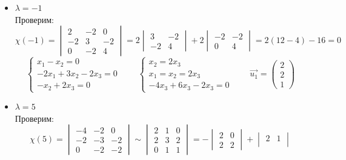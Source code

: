 \begin{itemize}
	\item $ \lambda = -1 $ \\
    Проверим:
    $$ \chi(-1) =
    \begin{vmatrix}
    	2 & -2 & 0 \\
        -2 & 3 & -2 \\
        0 & -2 & 4
    \end{vmatrix} = 2
    \begin{vmatrix}
    	3 & -2 \\
        -2 & 4
    \end{vmatrix} + 2
    \begin{vmatrix}
    	-2 & -2 \\
        0 & 4
    \end{vmatrix} = 2(12 - 4) - 16 = 0 $$
    $$
    \begin{cases}
    	x_1 - x_2 = 0 \\
        -2x_1 + 3x_2 - 2x_3 = 0 \\
        -x_2 + 2x_3 = 0
    \end{cases} \qquad
    \begin{cases}
    	x_2 = 2x_3 \\
        x_1 = x_2 = 2x_3 \\
        -4x_3 + 6x_3 - 2x_3 = 0
    \end{cases} \qquad \vec{u_1} =
    \begin{pmatrix}
    	2 \\
        2 \\
        1
    \end{pmatrix} $$
    \item $ \lambda = 5 $ \\
    Проверим:
    $$ \chi(5) =
    \begin{vmatrix}
    	-4 & -2 & 0 \\
        -2 & -3 & -2 \\
        0 & -2 & -2
    \end{vmatrix} \sim
    \begin{vmatrix}
    	2 & 1 & 0 \\
        2 & 3 & 2 \\
        0 & 1 & 1
    \end{vmatrix} = -
    \begin{vmatrix}
    	2 & 0 \\
        2 & 2
    \end{vmatrix} +
    \begin{vmatrix}
    	2 & 1 \\

\end{vmatrix}$$
\end{itemize}
